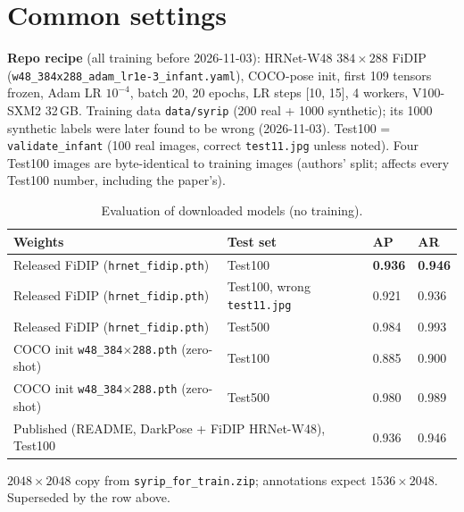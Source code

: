 \documentclass[10pt]{article}
\begin{document}
\section*{Common settings}
\textbf{Repo recipe} (all training before 2026-11-03): HRNet-W48 $384\times288$ FiDIP
(\texttt{w48\_384x288\_adam\_lr1e-3\_infant.yaml}), COCO-pose init, first 109 tensors frozen,
Adam LR $10^{-4}$, batch 20, 20 epochs, LR steps [10, 15], 4 workers, V100-SXM2 32\,GB.
Training data \texttt{data/syrip} (200 real + 1000 synthetic); its 1000 synthetic labels were
later found to be wrong (2026-11-03). Test100 = \texttt{validate\_infant} (100 real images, correct
\texttt{test11.jpg} unless noted). Four Test100 images are byte-identical to training images (authors' split;
affects every Test100 number, including the paper's).

\begin{table}[h]\centering\small
\begin{threeparttable}
\caption{Evaluation of downloaded models (no training).}
\begin{tabularx}{\linewidth}{X l l l}
\toprule
Weights & Test set & AP & AR \\
\midrule
Released FiDIP (\texttt{hrnet\_fidip.pth}) & Test100 & \textbf{0.936} & \textbf{0.946} \\
Released FiDIP (\texttt{hrnet\_fidip.pth}) & Test100, wrong \texttt{test11.jpg}\tnote{a} & 0.921 & 0.936 \\
Released FiDIP (\texttt{hrnet\_fidip.pth}) & Test500 & 0.984 & 0.993 \\
COCO init \texttt{w48\_384$\times$288.pth} (zero-shot) & Test100 & 0.885 & 0.900 \\
COCO init \texttt{w48\_384$\times$288.pth} (zero-shot) & Test500 & 0.980 & 0.989 \\
\midrule
\multicolumn{2}{l}{Published (README, DarkPose + FiDIP HRNet-W48), Test100} & 0.936 & 0.946 \\
\bottomrule
\end{tabularx}
\begin{tablenotes}\footnotesize
\item[a] $2048\times2048$ copy from \texttt{syrip\_for\_train.zip}; annotations expect $1536\times2048$. Superseded by the row above.
\end{tablenotes}
\end{threeparttable}
\end{table}
\end{document}
